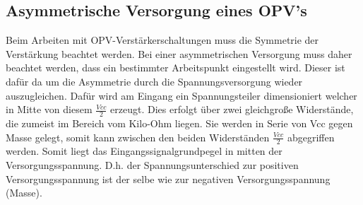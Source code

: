 
\subsection{Asymmetrische Versorgung eines OPV's}\label{subsec:3.5.1}
Beim Arbeiten mit OPV-Verstärkerschaltungen muss die Symmetrie der Verstärkung beachtet werden.
Bei einer asymmetrischen Versorgung muss daher beachtet werden, dass ein bestimmter Arbeitspunkt eingestellt wird.
Dieser ist dafür da um die Asymmetrie durch die Spannungsversorgung wieder auszugleichen.
Dafür wird am Eingang ein Spannungsteiler dimensioniert welcher in Mitte von diesem $\frac{Vcc}{2}$ erzeugt.
Dies erfolgt über zwei gleichgroße Widerstände, die zumeist im Bereich vom Kilo-Ohm liegen.
Sie werden in Serie von Vcc gegen Masse gelegt, somit kann zwischen den beiden Widerständen $\frac{Vcc}{2}$ abgegriffen werden.
Somit liegt das Eingangssignalgrundpegel in mitten der Versorgungsspannung.
D.h. der Spannungsunterschied zur positiven Versorgungsspannung ist der selbe wie zur negativen Versorgungsspannung (Masse). 



